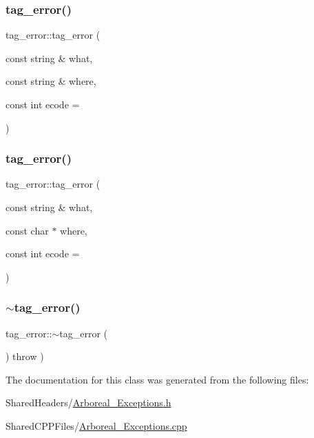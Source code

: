 \subsubsection{\texorpdfstring{tag\+\_\+error()}{tag\_error()}\hspace{0.1cm}{\footnotesize\ttfamily [3/4]}}
{\footnotesize\ttfamily tag\+\_\+error\+::tag\+\_\+error (\begin{DoxyParamCaption}\item[{const string \&}]{what,  }\item[{const string \&}]{where,  }\item[{const int}]{ecode = {} }\end{DoxyParamCaption})}

\mbox{\label{classtag__error_a70a4e7f9da04ca034f23e42ce1e95433}} 
\subsubsection{\texorpdfstring{tag\+\_\+error()}{tag\_error()}\hspace{0.1cm}{\footnotesize\ttfamily [4/4]}}
{\footnotesize\ttfamily tag\+\_\+error\+::tag\+\_\+error (\begin{DoxyParamCaption}\item[{const string \&}]{what,  }\item[{const char $\ast$}]{where,  }\item[{const int}]{ecode = {} }\end{DoxyParamCaption})}

\mbox{\label{classtag__error_a197c2032279f3288647bb87e42f2ae50}} 
\subsubsection{\texorpdfstring{$\sim$tag\+\_\+error()}{~tag\_error()}}
{\footnotesize\ttfamily tag\+\_\+error\+::$\sim$tag\+\_\+error (\begin{DoxyParamCaption}{ }\end{DoxyParamCaption}) throw  ) }



The documentation for this class was generated from the following files\+:\begin{DoxyCompactItemize}
\item 
Shared\+Headers/\mbox{\hyperlink{_arboreal___exceptions_8h}{Arboreal\+\_\+\+Exceptions.\+h}}\item 
Shared\+C\+P\+P\+Files/\mbox{\hyperlink{_arboreal___exceptions_8cpp}{Arboreal\+\_\+\+Exceptions.\+cpp}}\end{DoxyCompactItemize}
